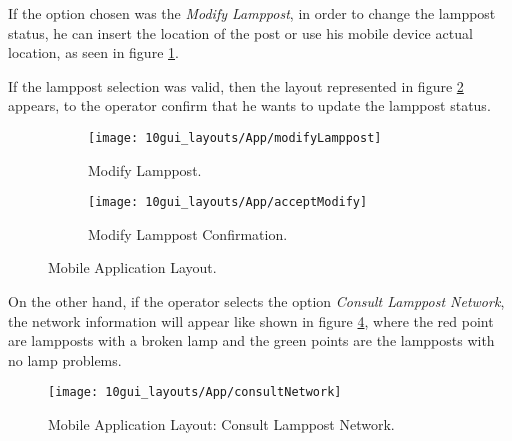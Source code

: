 \clearpage
If the option chosen was the \textit{Modify Lamppost}, in order to change the lamppost status, he can insert the location of the post or use his mobile device actual location, as seen in figure \ref{fig:modifyLamppost}.


If the lamppost selection was valid, then the layout represented in figure \ref{fig:acceptModify} appears, to the operator confirm that he wants to update the lamppost status.


\begin{figure}[H]
	\centering
	\begin{subfigure}{.5\textwidth}
		\centering
		\texttt{[image: 10gui\_layouts/App/modifyLamppost]}
		\caption{Modify Lamppost.}
		\label{fig:modifyLamppost}
	\end{subfigure}%
	\begin{subfigure}{.5\textwidth}
		\centering
		\texttt{[image: 10gui\_layouts/App/acceptModify]}
		\caption{Modify Lamppost Confirmation.}
		\label{fig:acceptModify}
	\end{subfigure}
	\caption{Mobile Application Layout.}
	\label{fig:App2}
\end{figure}

\clearpage
On the other hand, if the operator selects the option \textit{Consult Lamppost Network}, the network information will appear like shown in figure \ref{fig:consultNetwork}, where the red point are lampposts with a broken lamp and the green points are the lampposts with no lamp problems.

\begin{figure}[H]
	\centering	
	\texttt{[image: 10gui\_layouts/App/consultNetwork]}
	\caption{Mobile Application Layout: Consult Lamppost Network.}
	\label{fig:consultNetwork}
\end{figure}

\clearpage
{}

